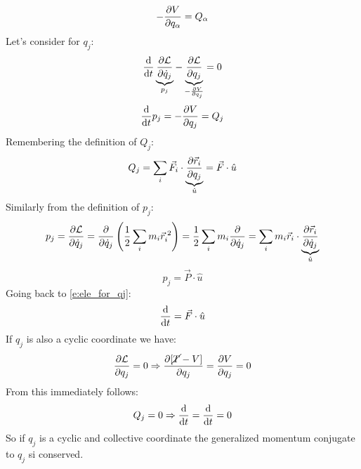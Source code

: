 \begin{equation}
    -\pdv{V}{q_{\alpha}} = Q_{\alpha}
\end{equation}
Let's consider \eleref\;for $q_j$:
\begin{equation}
    \dv{}{t}\underbrace{\pdv{\lagr}{\dot{q}_j}}_{p_j} - \underbrace{\pdv{\lagr}{q_j}}_{-\frac{\partial V}{\partial q_j}} = 0
\end{equation}
\begin{equation} \label{e:ele_for_qj}
    \dv{}{t}p_j = -\pdv{V}{q_j} = Q_j
\end{equation}
Remembering the definition of $Q_j$:
\begin{equation}
    Q_j = \bigsum_i \vec{F}_i \cdot \underbrace{\pdv{\vec{r}_i}{q_j}}_{\hat{u}} = \vec{F}\cdot \hat{u}
\end{equation}
Similarly from the definition of $p_j$:
\begin{equation}
    p_j = \pdv{\lagr}{\dot{q}_j} = \pdv{}{\dot{q}_j}\brackets{\dfrac{1}{2}\bigsum_i m_i \vec{r}_i^{\;2}} = \dfrac{1}{2}\bigsum_i m_i \pdv{}{\dot{q}_j}(\vec{r}_i^2) = \bigsum_i m_i \vec{r}_i \cdot \underbrace{\pdv{\vec{r}_i}{\dot{q}_j}}_{\hat{u}}
\end{equation}
\begin{equation}
    p_j = \vec{P}\cdot\hat{u}
\end{equation}
Going back to \eqref{e:ele_for_qj}:
\begin{equation}
    \dv{}{t}(\vec{P}\cdot\hat{u}) = \vec{F}\cdot \hat{u}
\end{equation}
If $q_j$ is also a cyclic coordinate we have:
\begin{equation}
    \pdv{\lagr}{q_j} = 0 \Rightarrow \pdv{[\cancel{T}-V]}{q_j} = \pdv{V}{q_j} = 0
\end{equation}
From this immediately follows:
\begin{equation}
    Q_j = 0 \Rightarrow \dv{}{t}(p_j) = \dv{}{t}(\vec{P}\cdot\hat{u}) = 0
\end{equation}
So if $q_j$ is a cyclic and collective coordinate the generalized momentum conjugate to $q_j$ si conserved.
